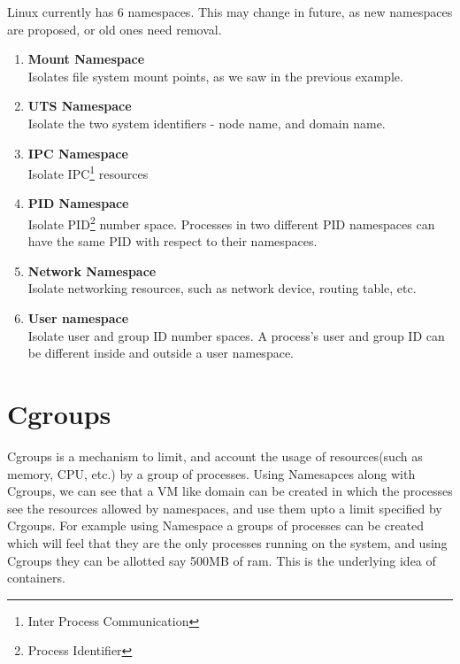 \documentclass[twoside]{iitbreport}
\begin{document}
Linux currently has 6 namespaces. This may change in future, as new namespaces are proposed, or old ones need removal.

\begin{enumerate}
\item \textbf{Mount Namespace}\\
Isolates file system mount points, as we saw in the previous example.
\item \textbf{UTS Namespace}\\
Isolate the two system identifiers - node name, and domain name.
\item \textbf{IPC Namespace}\\
Isolate IPC\footnote{Inter Process Communication} resources
\item \textbf{PID Namespace}\\
Isolate PID\footnote{Process Identifier} number space. Processes in two different PID namespaces can have the same PID with respect to their namespaces.
\item \textbf{Network Namespace}\\
Isolate networking resources, such as network device, routing table, etc.
\item \textbf{User namespace}\\
Isolate user and group ID number spaces. A process's user and group ID can be different inside and outside a user namespace.
\end{enumerate}

\section{Cgroups}
Cgroups is a mechanism to limit, and account the usage of resources(such as memory, CPU, etc.) by a group of processes. Using Namesapces along with Cgroups, we can see that a VM like domain can be created in which the processes see the resources allowed by namespaces, and use them upto a limit specified by Crgoups. For example using Namespace a groups of processes can be created which will feel that they are the only processes running on the system, and using Cgroups they can be allotted say 500MB of ram. This is the underlying idea of containers.
\end{document}
